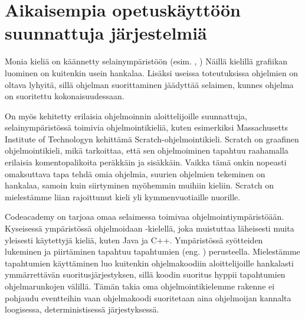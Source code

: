 
\section{Aikaisempia opetuskäyttöön suunnattuja järjestelmiä}
Monia kieliä on käännetty selainympäristöön
(esim. , ) \cite{repl.it}
Näillä kielillä grafiikan luominen on kuitenkin usein hankalaa.
Lisäksi useissa toteutuksissa ohjelmien on oltava lyhyitä,
sillä ohjelman suorittaminen jäädyttää selaimen,
kunnes ohjelma on suoritettu kokonaisuudessaan.

On myös kehitetty erilaisia ohjelmoinnin aloittelijoille suunnattuja,
selainympäristössä toimivia ohjelmointikieliä,
kuten esimerkiksi Massachusetts Institute of Technologyn
kehittämä Scratch-ohjelmointikieli.
Scratch on graafinen ohjelmointikieli,
mikä tarkoittaa,
että sen ohjelmoiminen tapahtuu raahamalla erilaisia komentopalikoita
peräkkäin ja sisäkkäin.
Vaikka tämä onkin nopeasti omaksuttava tapa tehdä omia ohjelmia,
suurien ohjelmien tekeminen on hankalaa,
samoin kuin siirtyminen myöhemmin muihiin kieliin.
Scratch on mielestämme liian rajoittunut kieli
yli kymmenvuotiaille nuorille.

Codeacademy on tarjoaa omaa selaimessa toimivaa ohjelmointiympäristöään.
Kyseisessä ympäristössä ohjelmoidaan -kielellä,
joka muistuttaa läheisesti muita yleisesti käytettyjä kieliä,
kuten Java ja C++.
Ympäristössä syötteiden lukeminen ja piirtäminen
tapahtuu tapahtumien (eng. ) perusteella.
Mielestämme tapahtumien käyttäminen luo kuitenkin ohjelmakoodiin
aloittelijoille hankalasti ymmärrettävän suoritusjärjestyksen,
sillä koodin suoritus hyppii tapahtumien ohjelmarunkojen välillä.
Tämän takia oma ohjelmointikielemme rakenne ei pohjaudu eventteihin
vaan ohjelmakoodi suoritetaan aina ohjelmoijan kannalta loogisessa,
deterministisessä järjestyksessä.

